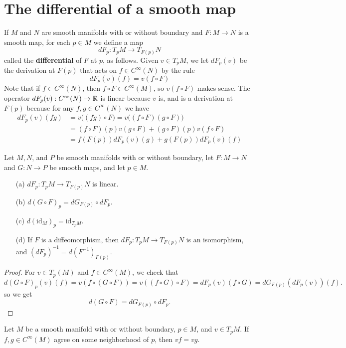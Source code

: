 \section{The differential of a smooth map}
If $M$ and $N$ are smooth manifolds with or without boundary and $F:M\to N$ is a smooth map, for each $p\in M$ we define a map
\[dF_p:T_pM\to T_{F(p)}N\]
called the \textbf{differential} of $F$ at $p$, as follows. Given $v\in T_pM$, we let $dF_p(v)$ be the derivation at $F(p)$ that acts on $f\in C^\infty(N)$ by the rule
\[dF_p(v)(f)=v(f\circ F)\]
Note that if $f\in C^\infty(N)$, then $f\circ F\in C^\infty(M)$, so $v(f\circ F)$ makes sense. The operator $dF_p(v):C^\infty(N)\to\mathbb{R}$ is linear because $v$ is, and is a derivation at $F(p)$ because for any $f,g\in C^\infty(N)$ we have
\begin{align*}
dF_p(v)(fg)&=v\big((fg)\circ F\big)=v\big((f\circ F)(g\circ F)\big)\\
&=(f\circ F)(p)v(g\circ F)+(g\circ F)(p)v(f\circ F)\\
&=f(F(p))dF_p(v)(g)+g(F(p))dF_p(v)(f)
\end{align*}
\begin{proposition}\label{differential mani prop}
Let $M,N$, and $P$ be smooth manifolds with or without boundary, let $F:M\to N$ and $G:N\to P$ be smooth maps, and let $p\in M$.
\begin{itemize}
\item[(a)]$dF_p:T_pM\to T_{F(p)}N$ is linear.
\item[(b)]$d(G\circ F)_p=dG_{F(p)}\circ dF_p$.
\item[(c)]$d(\mathrm{id}_M)_p=\mathrm{id}_{T_pM}$.
\item[(d)]If $F$ is a diffeomorphism, then $dF_p:T_pM\to T_{F(p)}N$ is an isomorphism, and $(dF_p)^{-1}=d(F^{-1})_{F(p)}$.
\end{itemize}
\end{proposition}
\begin{proof}
For $v\in T_p(M)$ and $f\in C^\infty(M)$, we check that
\[d(G\circ F)_p(v)(f)=v(f\circ(G\circ F))=v((f\circ G)\circ F)=dF_p(v)(f\circ G)=dG_{F(p)}(dF_p(v))(f).\]
so we get
\[d(G\circ F)=dG_{F(p)}\circ dF_p.\]
\end{proof}
\begin{proposition}\label{tangent space local}
Let $M$ be a smooth manifold with or without boundary, $p\in M$, and $v\in T_pM$. If $f,g\in C^\infty(M)$ agree on some neighborhood of $p$, then $vf=vg$.
\end{proposition}
